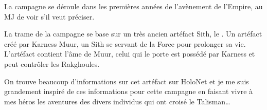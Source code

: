 \documentclass{jdrp}
\begin{document}
	La campagne se déroule dans les premières années de l’avènement de l’Empire, au MJ de voir s’il veut préciser.

	La trame de la campagne se base sur un très ancien artéfact Sith, le . Un artéfact créé par Karness Muur, un Sith se servant de la Force pour prolonger sa vie. L’artéfact contient l’âme de Muur, celui qui le porte est possédé par Karness et peut contrôler les Rakghoules.


	On trouve beaucoup d’informations sur cet artéfact sur HoloNet et je me suis grandement inspiré de ces informations pour cette campagne en faisant vivre à mes héros les aventures des divers individus qui ont croisé le Talisman\ldots

	\twocolumn

	
	
	
	
	

	\onecolumn
	\nocite{*}
	\printbibliography
\end{document}
